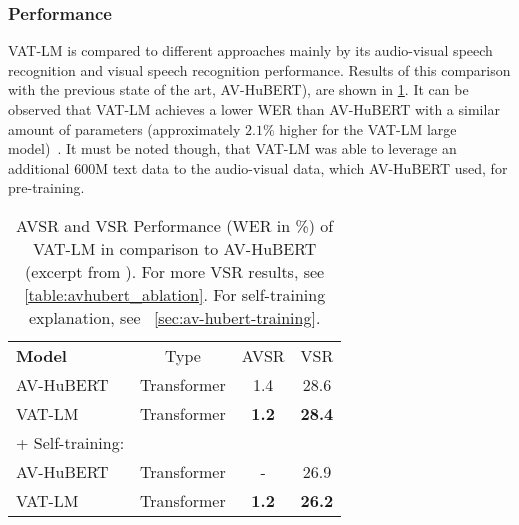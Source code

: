 \subsubsection{Performance}
VAT-LM is compared to different approaches mainly by its audio-visual speech recognition and visual speech recognition performance. Results of this comparison with the previous state of the art, AV-HuBERT), are shown in \ref{table:vatlm_performance}. It can be observed that VAT-LM achieves a lower WER than AV-HuBERT with a similar amount of parameters (approximately $2.1\%$ higher for the VAT-LM large model)~\cite{vatlm}. It must be noted though, that VAT-LM was able to leverage an additional 600M text data to the audio-visual data, which AV-HuBERT used, for pre-training.

\begin{table}[h]
        \centering
        \begin{tabular}{l c c c}
        \hline
        \textbf{Model} & Type & AVSR & VSR\\
        AV-HuBERT&Transformer&1.4&28.6\\
        VAT-LM &Transformer&\textbf{1.2}&\textbf{28.4}\\
        \hline
        + Self-training:&&&\\
        AV-HuBERT&Transformer&-&26.9\\
        VAT-LM&Transformer&\textbf{1.2}&\textbf{26.2}\\
        \hline
        \end{tabular}
    \caption{\label{table:vatlm_performance}AVSR and VSR Performance (WER in \%) of VAT-LM in comparison to AV-HuBERT (excerpt from \cite{vatlm}). For more VSR results, see \ref{table:avhubert_ablation}. For self-training explanation, see ~\ref{sec:av-hubert-training}.}
\end{table}